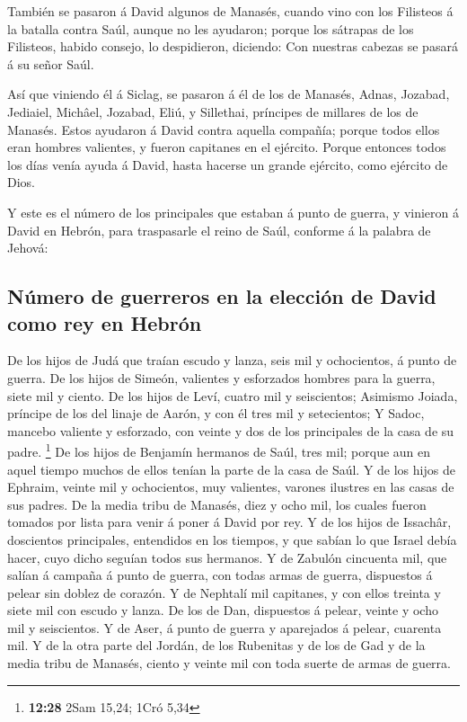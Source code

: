  También se pasaron á David algunos de Manasés, cuando
vino con los Filisteos á la batalla contra Saúl, aunque no les ayudaron;
porque los sátrapas de los Filisteos, habido consejo, lo despidieron,
diciendo: Con nuestras cabezas se pasará á su señor Saúl.

 Así que viniendo él á Siclag, se pasaron á él de los de
Manasés, Adnas, Jozabad, Jediaiel, Michâel, Jozabad, Eliú, y Sillethai,
príncipes de millares de los de Manasés.  Estos ayudaron
á David contra aquella compañía; porque todos ellos eran hombres
valientes, y fueron capitanes en el ejército.  Porque
entonces todos los días venía ayuda á David, hasta hacerse un grande
ejército, como ejército de Dios.

 Y este es el número de los principales que estaban á
punto de guerra, y vinieron á David en Hebrón, para traspasarle el reino
de Saúl, conforme á la palabra de Jehová:

\hypertarget{nuxfamero-de-guerreros-en-la-elecciuxf3n-de-david-como-rey-en-hebruxf3n}{%
\subsection{Número de guerreros en la elección de David como rey en
Hebrón}\label{nuxfamero-de-guerreros-en-la-elecciuxf3n-de-david-como-rey-en-hebruxf3n}}

 De los hijos de Judá que traían escudo y lanza, seis mil
y ochocientos, á punto de guerra.  De los hijos de
Simeón, valientes y esforzados hombres para la guerra, siete mil y
ciento.  De los hijos de Leví, cuatro mil y seiscientos;
 Asimismo Joiada, príncipe de los del linaje de Aarón, y
con él tres mil y setecientos;  Y Sadoc, mancebo valiente
y esforzado, con veinte y dos de los principales de la casa de su padre.
\footnote{\textbf{12:28} 2Sam 15,24; 1Cró 5,34}  De los
hijos de Benjamín hermanos de Saúl, tres mil; porque aun en aquel tiempo
muchos de ellos tenían la parte de la casa de Saúl.  Y de
los hijos de Ephraim, veinte mil y ochocientos, muy valientes, varones
ilustres en las casas de sus padres.  De la media tribu
de Manasés, diez y ocho mil, los cuales fueron tomados por lista para
venir á poner á David por rey.  Y de los hijos de
Issachâr, doscientos principales, entendidos en los tiempos, y que
sabían lo que Israel debía hacer, cuyo dicho seguían todos sus hermanos.
 Y de Zabulón cincuenta mil, que salían á campaña á punto
de guerra, con todas armas de guerra, dispuestos á pelear sin doblez de
corazón.  Y de Nephtalí mil capitanes, y con ellos
treinta y siete mil con escudo y lanza.  De los de Dan,
dispuestos á pelear, veinte y ocho mil y seiscientos.  Y
de Aser, á punto de guerra y aparejados á pelear, cuarenta mil.
 Y de la otra parte del Jordán, de los Rubenitas y de los
de Gad y de la media tribu de Manasés, ciento y veinte mil con toda
suerte de armas de guerra.

